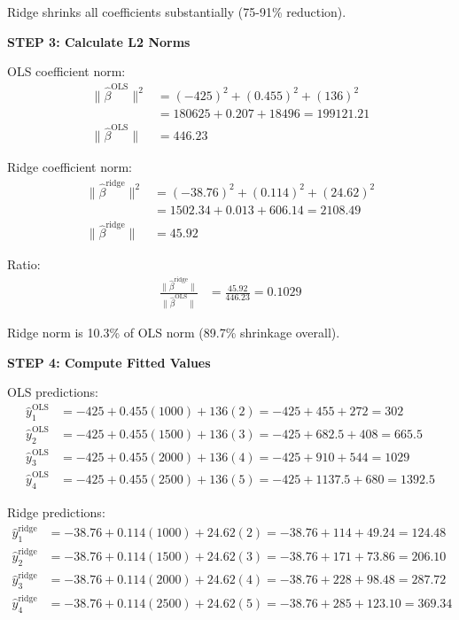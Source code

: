 \documentclass[12pt]{article}
\begin{document}
\begin{solution}
Ridge shrinks all coefficients substantially (75-91\% reduction).

\textbf{STEP 3: Calculate L2 Norms}

OLS coefficient norm:
\begin{align*}
\|\hat{\beta}^{\text{OLS}}\|^2 &= (-425)^2 + (0.455)^2 + (136)^2 \\
&= 180625 + 0.207 + 18496 = 199121.21 \\
\|\hat{\beta}^{\text{OLS}}\| &= 446.23
\end{align*}

Ridge coefficient norm:
\begin{align*}
\|\hat{\beta}^{\text{ridge}}\|^2 &= (-38.76)^2 + (0.114)^2 + (24.62)^2 \\
&= 1502.34 + 0.013 + 606.14 = 2108.49 \\
\|\hat{\beta}^{\text{ridge}}\| &= 45.92
\end{align*}

Ratio:
\begin{align*}
\frac{\|\hat{\beta}^{\text{ridge}}\|}{\|\hat{\beta}^{\text{OLS}}\|} &= \frac{45.92}{446.23} = 0.1029
\end{align*}

Ridge norm is 10.3\% of OLS norm (89.7\% shrinkage overall).

\textbf{STEP 4: Compute Fitted Values}

OLS predictions:
\begin{align*}
\hat{y}_1^{\text{OLS}} &= -425 + 0.455(1000) + 136(2) = -425 + 455 + 272 = 302 \\
\hat{y}_2^{\text{OLS}} &= -425 + 0.455(1500) + 136(3) = -425 + 682.5 + 408 = 665.5 \\
\hat{y}_3^{\text{OLS}} &= -425 + 0.455(2000) + 136(4) = -425 + 910 + 544 = 1029 \\
\hat{y}_4^{\text{OLS}} &= -425 + 0.455(2500) + 136(5) = -425 + 1137.5 + 680 = 1392.5
\end{align*}

Ridge predictions:
\begin{align*}
\hat{y}_1^{\text{ridge}} &= -38.76 + 0.114(1000) + 24.62(2) = -38.76 + 114 + 49.24 = 124.48 \\
\hat{y}_2^{\text{ridge}} &= -38.76 + 0.114(1500) + 24.62(3) = -38.76 + 171 + 73.86 = 206.10 \\
\hat{y}_3^{\text{ridge}} &= -38.76 + 0.114(2000) + 24.62(4) = -38.76 + 228 + 98.48 = 287.72 \\
\hat{y}_4^{\text{ridge}} &= -38.76 + 0.114(2500) + 24.62(5) = -38.76 + 285 + 123.10 = 369.34
\end{align*}


\end{solution}
\end{document}
